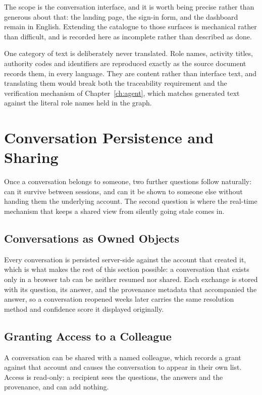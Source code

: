 The scope is the conversation interface, and it is worth being precise rather than
generous about that: the landing page, the sign-in form, and the dashboard remain in
English. Extending the catalogue to those surfaces is mechanical rather than difficult,
and is recorded here as incomplete rather than described as done.

One category of text is deliberately never translated. Role names, activity titles,
authority codes and identifiers are reproduced exactly as the source document records
them, in every language. They are content rather than interface text, and translating them
would break both the traceability requirement and the verification mechanism of
Chapter~\ref{ch:agent}, which matches generated text against the literal role names held
in the graph.

\section{Conversation Persistence and Sharing}

Once a conversation belongs to someone, two further questions follow naturally: can it
survive between sessions, and can it be shown to someone else without handing them the
underlying account. The second question is where the real-time mechanism that keeps a
shared view from silently going stale comes in.

\subsection{Conversations as Owned Objects}

Every conversation is persisted server-side against the account that created it, which is
what makes the rest of this section possible: a conversation that exists only in a browser
tab can be neither resumed nor shared. Each exchange is stored with its question, its
answer, and the provenance metadata that accompanied the answer, so a conversation
reopened weeks later carries the same resolution method and confidence score it displayed
originally.

\subsection{Granting Access to a Colleague}

A conversation can be shared with a named colleague, which records a grant against that
account and causes the conversation to appear in their own list. Access is read-only: a
recipient sees the questions, the answers and the provenance, and can add nothing.

